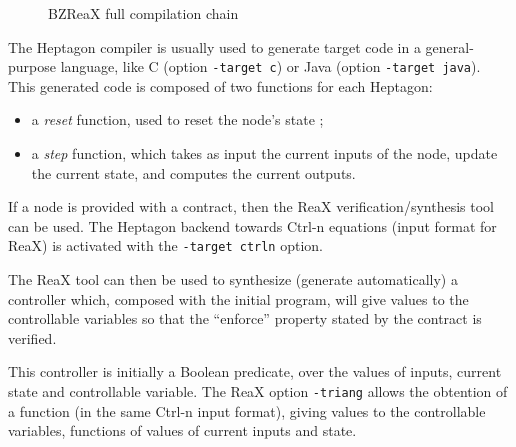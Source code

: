 \documentclass[a4paper]{article}
\begin{document}
\begin{figure}

\caption{BZReaX full compilation chain}
\label{fig:bzreax-compil}
\end{figure}

The Heptagon compiler is usually used to generate target code in a
general-purpose language, like C (option \texttt{-target c}) or Java
(option \texttt{-target java}). This generated code is composed of two
functions for each Heptagon:
\begin{itemize}
\item a \emph{reset} function, used to reset the node's state ;
\item a \emph{step} function, which takes as input the current inputs
  of the node, update the current state, and computes the current
  outputs.
\end{itemize}

If a node is provided with a contract, then the ReaX
verification/synthesis tool can be used. The Heptagon backend towards
Ctrl-n equations (input format for ReaX) is activated with the
\texttt{-target ctrln} option.

The ReaX tool can then be used to synthesize (generate automatically)
a controller which, composed with the initial program, will give
values to the controllable variables so that the ``enforce'' property
stated by the contract is verified.

This controller is initially a Boolean predicate, over the values of
inputs, current state and controllable variable. The ReaX option
\texttt{-triang} allows the obtention of a function (in the same
Ctrl-n input format), giving values to the controllable variables,
functions of values of current inputs and state.
\end{document}
